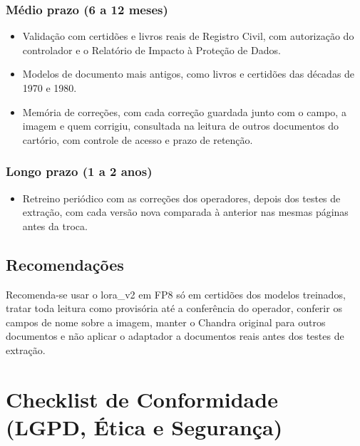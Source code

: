 \subsubsection{Médio prazo (6 a 12 meses)}
\begin{itemize}
    \item Validação com certidões e livros reais de Registro Civil, com autorização do controlador e o Relatório de Impacto à Proteção de Dados.
    \item Modelos de documento mais antigos, como livros e certidões das décadas de 1970 e 1980.
    \item Memória de correções, com cada correção guardada junto com o campo, a imagem e quem corrigiu, consultada na leitura de outros documentos do cartório, com controle de acesso e prazo de retenção.
\end{itemize}

\subsubsection{Longo prazo (1 a 2 anos)}
\begin{itemize}
    \item Retreino periódico com as correções dos operadores, depois dos testes de extração, com cada versão nova comparada à anterior nas mesmas páginas antes da troca.
\end{itemize}

\subsection{Recomendações}
Recomenda-se usar o lora\_v2 em FP8 só em certidões dos modelos treinados, tratar toda leitura como provisória até a conferência do operador, conferir os campos de nome sobre a imagem, manter o Chandra original para outros documentos e não aplicar o adaptador a documentos reais antes dos testes de extração.

\section{Checklist de Conformidade (LGPD, Ética e Segurança)}
\label{sec:checklist}


